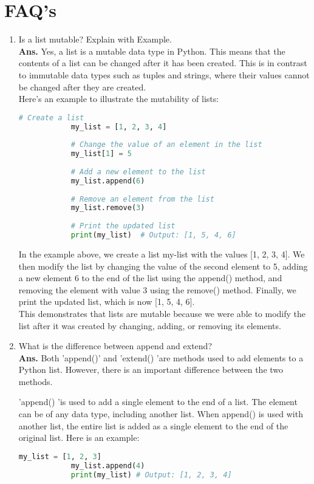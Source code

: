 \documentclass{article}
\begin{document}
	\section{\textbf{FAQ's}}
	\begin{enumerate}
		\item Is a list mutable? Explain with Example.\\
		
		\textbf{Ans.}  Yes, a list is a mutable data type in Python. This means that the contents of a list can be changed after it has been created. This is in contrast to immutable data types such as tuples and strings, where their values cannot be changed after they are created.\\
		
		Here's an example to illustrate the mutability of lists:
		\begin{lstlisting}[language=Python, caption={Example}]
			# Create a list
			my_list = [1, 2, 3, 4]
			
			# Change the value of an element in the list
			my_list[1] = 5
			
			# Add a new element to the list
			my_list.append(6)
			
			# Remove an element from the list
			my_list.remove(3)
			
			# Print the updated list
			print(my_list)  # Output: [1, 5, 4, 6]
		\end{lstlisting}
		In the example above, we create a list my-list with the values [1, 2, 3, 4]. We then modify the list by changing the value of the second element to 5, adding a new element 6 to the end of the list using the append() method, and removing the element with value 3 using the remove() method. Finally, we print the updated list, which is now [1, 5, 4, 6].\\
		
		This demonstrates that lists are mutable because we were able to modify the list after it was created by changing, adding, or removing its elements.
		
		\item What is the difference between append and extend?\\
		
		\textbf{Ans.}  Both 'append()' and 'extend() 'are methods used to add elements to a Python list. However, there is an important difference between the two methods.
		
		'append() 'is used to add a single element to the end of a list. The element can be of any data type, including another list. When append() is used with another list, the entire list is added as a single element to the end of the original list. Here is an example:
		\begin{lstlisting}[language=python, caption={append example}]
			my_list = [1, 2, 3]
			my_list.append(4)
			print(my_list) # Output: [1, 2, 3, 4]
			

\end{lstlisting}
\end{enumerate}
\end{document}
